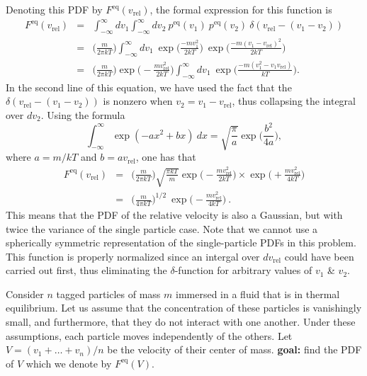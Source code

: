 Denoting this PDF by $F^\text{eq}(v_\text{rel})$, the formal expression for this function is
\begin{eqnarray}
F^\text{eq}(v_\text{rel}) &=& \int_{-\infty}^{\infty} dv_1 \int_{-\infty}^{\infty} dv_2 ~ p^\text{eq}(v_1) ~ p^\text{eq}(v_2) ~ \delta(v_\text{rel} - (v_1-v_2)) \nonumber \\
&=& \bigg( \frac{m}{2\pi k T}\bigg) \int_{-\infty}^{\infty} dv_1 ~ \exp\bigg(\frac{-m v_1^2}{2 k T}\bigg)~\exp\bigg(\frac{-m (v_1-v_\text{rel})^2}{2 k T}\bigg) \nonumber \\
&=& \bigg( \frac{m}{2\pi k T}\bigg) \exp\bigg(-\frac{m v_\text{rel}^2}{2 k T}\bigg) \int_{-\infty}^{\infty} dv_1 ~\exp\bigg(\frac{-m (v_1^2-v_1 v_\text{rel})}{k T}\bigg). \nonumber
\end{eqnarray}
In the second line of this equation, we have used the fact that the $\delta(v_\text{rel} - (v_1-v_2))$ is nonzero when $v_2=v_1-v_\text{rel}$, thus collapsing the integral over $dv_2$.
Using the formula
\begin{equation}
\int_{-\infty}^{\infty} \exp(-a x^2 + bx)~dx = \sqrt{\frac{\pi}{a}} \exp\bigg(\frac{b^2}{4a}\bigg), \nonumber
\end{equation}
where $a=m/k T$ and $b = a v_\text{rel}$, one has that
\begin{eqnarray}
F^\text{eq}(v_\text{rel}) &=& \bigg( \frac{m}{2\pi k T}\bigg) \sqrt{\frac{\pi k T}{m}} \exp\bigg(-\frac{m v_\text{rel}^2}{2 k T}\bigg) \times \exp\bigg(+\frac{m v_\text{rel}^2}{4 k T}\bigg) \nonumber \\
&=& \boxed{\bigg( \frac{m}{4\pi k T}\bigg)^{1/2} ~ \exp\bigg(-\frac{m v_\text{rel}^2}{4 k T}\bigg)}~.
\end{eqnarray}
This means that the PDF of the relative velocity is also a Gaussian, but with twice the variance of the single particle case. Note that we cannot use a spherically symmetric representation of the single-particle PDFs in this problem. This function is properly normalized since an intergal over $d v_\text{rel}$ could have been carried out first, thus eliminating the $\delta$-function for arbitrary values of $v_1$ \& $v_2$.



Consider $n$ tagged particles of mass $m$ immersed in a fluid that is in thermal equilibrium. Let us assume that the concentration of these particles is vanishingly small, and furthermore, that they do not interact with one another. Under these assumptions, each particle moves independently of the others. Let $V = (v_1 + \ldots + v_n)/n$ be the velocity of their center of mass. \textbf{goal:} find the PDF of $V$ which we denote by $F^\text{eq}(V)$.

